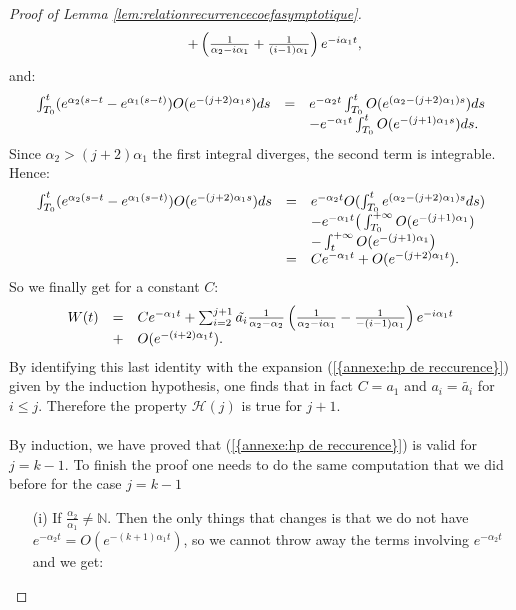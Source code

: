 \documentclass[11pt,a4paper,reqno]{amsart}
\theoremstyle{remark}
\numberwithin{equation}{section}
\begin{document}
\begin{appendix}
\begin{proof}[Proof of Lemma \ref{lem:relationrecurrencecoefasymptotique}]
$$\begin{array}{r c l}
&& +\left(\frac{1}{\alpha_2-i\alpha_1}+\frac{1}{(i-1)\alpha_1}\right)e^{-i\alpha_1 t},
\end{array}
$$
and:
\begin{equation}\label{eq:calcul_iteration_remainder}
\begin{array}{r c l}
\int_{T_0}^t(e^{\alpha_2(s-t}-e^{\alpha_1(s-t)})O(e^{-(j+2)\alpha_1 s})ds &=& e^{-\alpha_2 t} \int_{T_0}^t O(e^{(\alpha_2-(j+2)\alpha_1) s})ds \\
&&-e^{-\alpha_1 t} \int_{T_0}^t O(e^{-(j+1)\alpha_1 s})ds . \\
\end{array}
\end{equation}
Since $\alpha_2>(j+2)\alpha_1$ the first integral diverges, the second term is integrable. Hence:
$$
\begin{array}{r c l}
\int_{T_0}^t(e^{\alpha_2(s-t}-e^{\alpha_1(s-t)})O(e^{-(j+2)\alpha_1 s})ds &=& e^{-\alpha_2 t}O(\int_{T_0}^t e^{(\alpha_2-(j+2)\alpha_1) s}ds ) \\
&& - e^{-\alpha_1 t} \big{(}\int_{T_0}^{+\infty} O(e^{-(j+1)\alpha_1}) \\
&& -\int_t^{+\infty}O(e^{-(j+1)\alpha_1}\big{)} \\
&=& Ce^{-\alpha_1 t}+O(e^{-(j+2)\alpha_1 t}) .
\end{array}
$$
So we finally get for a constant $C$:
\begin{equation}
\begin{array}{r c l}
W(t)&=& Ce^{-\alpha_1 t}+\sum_{i=2}^{j+1} \tilde{a_i}\frac{1}{\alpha_2-\alpha_2}\left(\frac{1}{\alpha_2-i\alpha_1}-\frac{1}{-(i-1)\alpha_1}\right)e^{-i\alpha_1 t} \\
&+& O(e^{-(i+2)\alpha_1 t}) .
\end{array}
\end{equation}
By identifying this last identity with the expansion {{\rm (\ref{{annexe:hp de reccurence}})}} given by the induction hypothesis, one finds that in fact $C=a_1$ and $a_i=\tilde{a_i}$ for $i\leq j$. Therefore the property $\mathcal{H}(j) $ is true for $j+1$.\\
\\
By induction, we have proved that {{\rm (\ref{{annexe:hp de reccurence}})}} is valid for $j=k-1$. To finish the proof one needs to do the same computation that we did before for the case $j=k-1$
\begin{itemize}
\item[(i)] If $\frac{\alpha_2}{\alpha_1}\neq \mathbb{N}$. Then the only things that changes is that we do not have $e^{-\alpha_2 t}=O(e^{-(k+1)\alpha_1 t})$, so we cannot throw away the terms involving $e^{-\alpha_2 t}$ and we get:

\end{itemize}
\end{proof}
\end{appendix}
\end{document}
